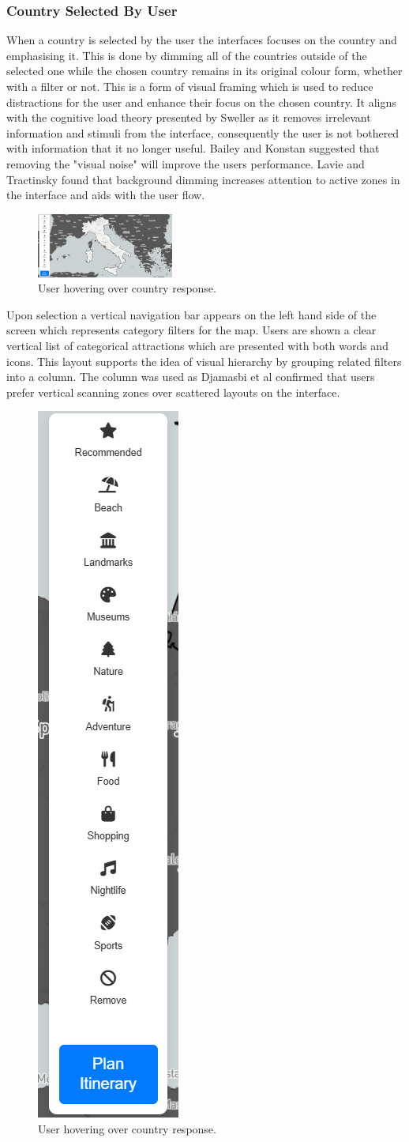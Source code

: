 \documentclass[]{project_final}
\begin{document}
\subsubsection{Country Selected By User}
When a country is selected by the user the interfaces focuses on the country and emphasising it. This is done by dimming all of the countries outside of the selected one while the chosen country remains in its original colour form, whether with a filter or not. This is a form of visual framing which is used to reduce distractions for the user and enhance their focus on the chosen country.
It aligns with the cognitive load theory presented by Sweller as it removes irrelevant information and stimuli from the interface, consequently the user is not bothered with information that it no longer useful. Bailey and Konstan suggested that removing the "visual noise" will improve the users performance. Lavie and Tractinsky found that background dimming increases attention to active zones in the interface and aids with the user flow.

\begin{figure}[ht!]
    \centering
    \includegraphics[width=0.4\textwidth]{9.png}
    \caption{User hovering over country response.}
    \label{fig:1}
\end{figure}

Upon selection a vertical navigation bar appears on the left hand side of the screen which represents category filters for the map. Users are shown a clear vertical list of categorical attractions which are presented with both words and icons. This layout supports the idea of visual hierarchy by grouping related filters into a column. The column was used as Djamasbi et al confirmed that users prefer vertical scanning zones over scattered layouts on the interface.

\begin{figure}[ht!]
    \centering
    \includegraphics[height=0.4\textwidth]{Vertical filters.png}
    \caption{User hovering over country response.}
    \label{fig:1}
\end{figure}
\end{document}
